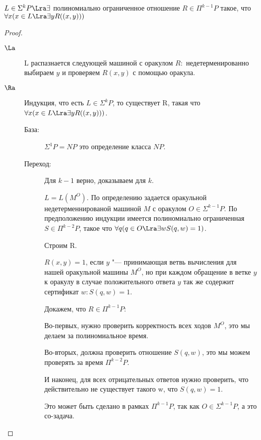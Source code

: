 \begin{theorem}
	$L \in \Sigma^{k}P \Lra \exists$ полиномиально ограниченное отношение $R \in \Pi^{k - 1}P$ такое,
	что $\forall x (x \in L \Lra \exists y R((x, y)))$
\end{theorem}
\begin{proof}
	\begin{description}
	\item[$\La$] L распазнается следующей машиной с оракулом $R:$ недетерменированно выбираем $y$ и проверяем $R(x, y)$ с помощью оракула.
	\item[$\Ra$] 
		Индукция, что есть $L \in \Sigma^{k}P$, то существует R, такая что $\forall x (x \in L \Lra \exists y R((x, y)))$. 
    		\begin{description}
    		\item[База:]
    			$\Sigma^1 P = NP$ это определение класса $NP$.
    		\item[Переход:] 
   			Для $k - 1$ верно, доказываем для $k$.
    
    			$L = L(M^O)$.
    			По определению задается оракульной недетерменнированой машиной $M$ с оракулом $O \in \Sigma^{k - 1}P$. 
    			По предположению индукции имеется полиномиально ограниченная $S \in \Pi^{k - 2}P$, такое что 
    			$\forall q(q \in O \Lra \exists w S(q, w) = 1)$.

    			Строим R.

   			$R(x, y) = 1$, если $y$ "--- принимающая ветвь вычисления для нашей оракульной машины $M^O$, 
   			но при каждом обращение в ветке $y$ к оракулу в случае положительного ответа $y$ так же содержит 
   			сертификат $w \colon S(q, w) = 1$.

  			Докажем, что $R \in \Pi^{k - 1}P:$ 
  			
  			Во-первых, нужно проверить корректность всех ходов $M^O$,
  			это мы делаем за полиномиальное время.  
  			
  			Во-вторых, должна проверить отношение $S(q, w)$, это мы 
  			можем проверять за время $\Pi^{k - 2}P$. 

  			И наконец, для всех отрицательных ответов нужно проверить, что
  			действительно не существует такого w, что $S(q, w) = 1$. 
  			
  			Это может быть сделано в рамках $\Pi^{k - 1}P$, так как $O \in \Sigma^{k - 1}P$, 
  			а это со-задача.
  		\end{description}
	\end{description}
\end{proof}             

